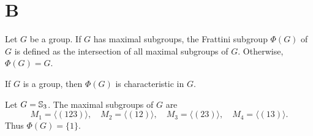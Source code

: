 %
%
%

\section*{B}

Let $G$ be a group. If $G$ has maximal subgroups, the Frattini subgroup
$\Phi(G)$ of $G$ is defined as the intersection of all maximal subgroups of $G$. 
Otherwise, $\Phi(G)=G$.

\begin{exercise}
\label{xca:Phi(G)char}
	If $G$ is a group, then $\Phi(G)$ is characteristic in $G$.
\end{exercise}

\begin{example}
	Let $G=\mathbb{S}_3$. The maximal subgroups of $G$ are 
	\[
	M_1=\langle (123)\rangle,
	\quad
	M_2=\langle (12)\rangle,
	\quad
	M_3=\langle (23)\rangle,
	\quad
	M_4=\langle (13)\rangle.
	\]
	Thus 
	$\Phi(G)=\{1\}$. 
\end{example}

